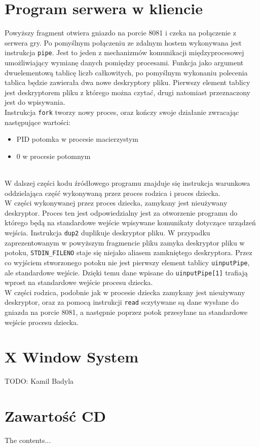 \begin{appendices}
\section{Program serwera w kliencie}
\label{app:server_c}

Powyższy fragment otwiera gniazdo na porcie 8081 i czeka na połączenie z serwera gry. Po pomyślnym połączeniu ze zdalnym hostem wykonywana jest instrukcja \lstinline|pipe|. Jest to jeden z mechanizmów komunikacji międzyprocesowej umożliwiający wymianę danych pomiędzy procesami. Funkcja jako argument dwuelementową tablicę liczb całkowitych, po pomyślnym wykonaniu polecenia tablica będzie zawierała dwa nowe deskryptory pliku. Pierwszy element tablicy jest deskryptorem pliku z którego można czytać, drugi natomiast przeznaczony jest do wpisywania.
\\
Instrukcja \lstinline|fork| tworzy nowy proces, oraz kończy swoje działanie zwracając następujące wartości:
\\
\begin{itemize}
	\item PID potomka w procesie macierzystym
	\item 0 w procesie potomnym
\end{itemize}
\\
W dalszej części kodu źródłowego programu znajduje się instrukcja warunkowa oddzielająca część wykonywaną przez proces rodzica i proces dziecka. 
\\
W części wykonywanej przez proces dziecka, zamykany jest nieużywany deskryptor. Proces ten jest odpowiedzialny jest za otworzenie programu do którego będą na standardowe wejście wpisywane komunikaty dotyczące urządzeń wejścia. Instrukcja \lstinline|dup2| duplikuje deskryptor pliku. W przypadku zaprezentowanym w powyższym fragmencie pliku zamyka deskryptor pliku w potoku, \lstinline|STDIN_FILENO| staje się niejako aliasem zamkniętego deskryptora. Przez co wyjściem stworzonego potoku nie jest pierwszy element tablicy \lstinline|uinputPipe|, ale standardowe wejście. Dzięki temu dane wpisane do \lstinline|uinputPipe[1]| trafiają wprost na standardowe wejście procesu dziecka.
\\
W części rodzica, podobnie jak w procesie dziecka zamykany jest nieużywany deskryptor, oraz za pomocą instrukcji \lstinline|read| sczytywane są dane wysłane do gniazda na porcie 8081, a następnie poprzez potok przesyłane na standardowe wejście procesu dziecka.
		


\newpage
\section{X Window System}
\label{app:X Window System}
TODO: Kamil Badyla



\section{Zawartość CD}

The contents...

\end{appendices}
